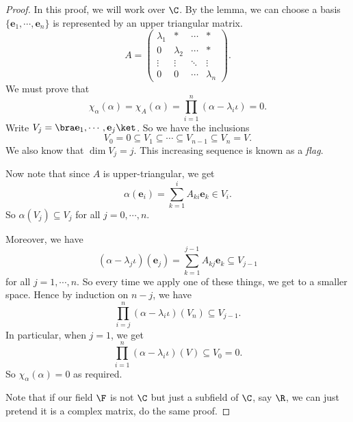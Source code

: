\documentclass[a4paper]{article}
\begin{document}
\begin{proof}
  In this proof, we will work over $\C$. By the lemma, we can choose a basis $\{\mathbf{e}_1, \cdots, \mathbf{e}_n\}$ is represented by an upper triangular matrix.
  \[
    A =
    \begin{pmatrix}
      \lambda_1 & * & \cdots & *\\
      0 & \lambda_2 & \cdots & *\\
      \vdots & \vdots & \ddots & \vdots\\
      0 & 0 & \cdots & \lambda_n
    \end{pmatrix}.
  \]
  We must prove that
  \[
    \chi_\alpha(\alpha) = \chi_A(\alpha) = \prod_{i = 1}^n (\alpha - \lambda_i \iota) = 0.
  \]
  Write $V_j = \bra \mathbf{e}_1, \cdots, \mathbf{e}_j\ket$. So we have the inclusions
  \[
    V_0 = 0 \subseteq V_1 \subseteq \cdots \subseteq V_{n - 1} \subseteq V_n = V.
  \]
  We also know that $\dim V_j = j$. This increasing sequence is known as a \emph{flag}.

  Now note that since $A$ is upper-triangular, we get
  \[
    \alpha(\mathbf{e}_i) = \sum_{k = 1}^i A_{ki} \mathbf{e}_k \in V_i.
  \]
  So $\alpha (V_j)\subseteq V_j$ for all $j = 0, \cdots, n$.

  Moreover, we have
  \[
    (\alpha - \lambda_j\iota)(\mathbf{e}_j) = \sum_{k = 1}^{j - 1} A_{kj}\mathbf{e}_k \subseteq V_{j - 1}
  \]
  for all $j = 1, \cdots, n$. So every time we apply one of these things, we get to a smaller space. Hence by induction on $n - j$, we have
  \[
    \prod_{i = j}^n (\alpha - \lambda_i \iota) (V_n) \subseteq V_{j - 1}.
  \]
  In particular, when $j = 1$, we get
  \[
    \prod_{i = 1}^n (\alpha - \lambda_i \iota) (V) \subseteq V_0 = 0.
  \]
  So $\chi_\alpha(\alpha) = 0$ as required.

  Note that if our field $\F$ is not $\C$ but just a subfield of $\C$, say $\R$, we can just pretend it is a complex matrix, do the same proof.
\end{proof}
\end{document}
